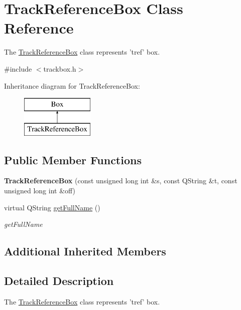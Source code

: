 \hypertarget{class_track_reference_box}{\section{Track\-Reference\-Box Class Reference}
\label{class_track_reference_box}
}


The \hyperlink{class_track_reference_box}{Track\-Reference\-Box} class represents 'tref' box.  




{\ttfamily \#include $<$trackbox.\-h$>$}

Inheritance diagram for Track\-Reference\-Box\-:\begin{figure}[H]
\begin{center}
\leavevmode
\includegraphics[height=2.000000cm]{class_track_reference_box}
\end{center}
\end{figure}
\subsection*{Public Member Functions}
\begin{DoxyCompactItemize}
\item 
\hypertarget{class_track_reference_box_a989bf36d8327bad28e4361b2dc4bdd71}{{\bfseries Track\-Reference\-Box} (const unsigned long int \&s, const Q\-String \&t, const unsigned long int \&off)}\label{class_track_reference_box_a989bf36d8327bad28e4361b2dc4bdd71}

\item 
virtual Q\-String \hyperlink{class_track_reference_box_ae140565faf9eb4e95fd8ab3de418c308}{get\-Full\-Name} ()
\begin{DoxyCompactList}\small\item\em get\-Full\-Name \end{DoxyCompactList}\end{DoxyCompactItemize}
\subsection*{Additional Inherited Members}


\subsection{Detailed Description}
The \hyperlink{class_track_reference_box}{Track\-Reference\-Box} class represents 'tref' box. 

